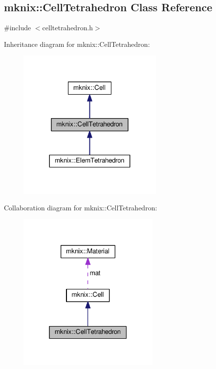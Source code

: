 \hypertarget{classmknix_1_1_cell_tetrahedron}{}\subsection{mknix\+:\+:Cell\+Tetrahedron Class Reference}
\label{classmknix_1_1_cell_tetrahedron}


{\ttfamily \#include $<$celltetrahedron.\+h$>$}



Inheritance diagram for mknix\+:\+:Cell\+Tetrahedron\+:\nopagebreak
\begin{figure}[H]
\begin{center}
\leavevmode
\includegraphics[width=203pt]{dd/d62/classmknix_1_1_cell_tetrahedron__inherit__graph}
\end{center}
\end{figure}


Collaboration diagram for mknix\+:\+:Cell\+Tetrahedron\+:\nopagebreak
\begin{figure}[H]
\begin{center}
\leavevmode
\includegraphics[width=198pt]{dc/db5/classmknix_1_1_cell_tetrahedron__coll__graph}
\end{center}
\end{figure}
